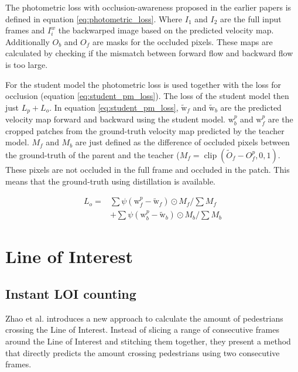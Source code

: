 The photometric loss \cite{Yu2016} with occlusion-awareness \cite{Janai2018} proposed in the earlier papers is defined in equation \ref{eq:photometric_loss}. Where $I_1$ and $I_2$ are the full input frames and $I_i^w$ the backwarped image based on the predicted velocity map. Additionally $O_b$ and $O_f$ are masks for the occluded pixels. These maps are calculated by checking if the mismatch between forward flow and backward flow is too large.

For the student model the photometric loss is used together with the loss for occlusion (equation \ref{eq:student_pm_loss}). The loss of the student model then just $L_p+L_o$. In equation \ref{eq:student_pm_loss}, $\widetilde{\mathrm{w}}_{f}$ and $\widetilde{\mathrm{w}}_{b}$ are the predicted velocity map forward and backward using the student model. $\mathrm{w}_{b}^{p}$ and $\mathrm{w}_{f}^{p}$ are the cropped patches from the ground-truth velocity map predicted by the teacher model. $M_f$ and $M_b$ are just defined as the difference of occluded pixels between the ground-truth of the parent and the teacher ($M_{f}=\operatorname{clip}\left(\widetilde{O}_{f}-O_{f}^{p}, 0,1\right)$. These pixels are not occluded in the full frame and occluded in the patch. This means that the ground-truth using distillation is available.

\begin{equation}
\begin{aligned}
L_{o}=&\sum \psi\left(\mathrm{w}_{f}^{p}-\widetilde{\mathrm{w}}_{f}\right) \odot M_{f} / \sum M_{f} \\
&+\sum \psi\left(\mathrm{w}_{b}^{p}-\widetilde{\mathrm{w}}_{b}\right) \odot M_{b} / \sum M_{b}
\end{aligned}
\label{eq:student_pm_loss}
\end{equation}

\section{Line of Interest}

\subsection{Instant LOI counting}
\label{section:crossing_line_2016}
Zhao et al. \cite{leibe_crossing-line_2016} introduces a new approach to calculate the amount of pedestrians crossing the Line of Interest. Instead of slicing a range of consecutive frames around the Line of Interest and stitching them together, they present a method that directly predicts the amount crossing pedestrians using two consecutive frames.

